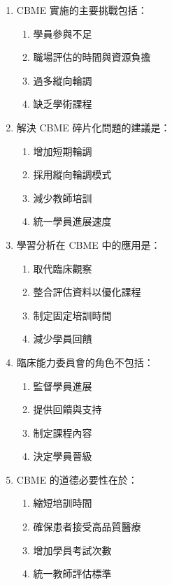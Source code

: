 \documentclass[12pt,a4paper]{article}
\begin{document}
\begin{enumerate}
    \item CBME 實施的主要挑戰包括：
    \begin{enumerate}[label=\alph*)]
        \item 學員參與不足
        \item 職場評估的時間與資源負擔
        \item 過多縱向輪調
        \item 缺乏學術課程
    \end{enumerate}

    \item 解決 CBME 碎片化問題的建議是：
    \begin{enumerate}[label=\alph*)]
        \item 增加短期輪調
        \item 採用縱向輪調模式
        \item 減少教師培訓
        \item 統一學員進展速度
    \end{enumerate}

    \item 學習分析在 CBME 中的應用是：
    \begin{enumerate}[label=\alph*)]
        \item 取代臨床觀察
        \item 整合評估資料以優化課程
        \item 制定固定培訓時間
        \item 減少學員回饋
    \end{enumerate}

    \item 臨床能力委員會的角色不包括：
    \begin{enumerate}[label=\alph*)]
        \item 監督學員進展
        \item 提供回饋與支持
        \item 制定課程內容
        \item 決定學員晉級
    \end{enumerate}

    \item CBME 的道德必要性在於：
    \begin{enumerate}[label=\alph*)]
        \item 縮短培訓時間
        \item 確保患者接受高品質醫療
        \item 增加學員考試次數
        \item 統一教師評估標準
    \end{enumerate}
\end{enumerate}
\end{document}
